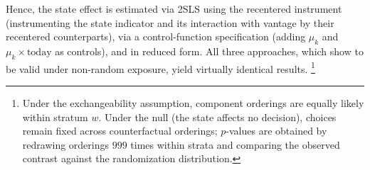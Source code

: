 \documentclass[11pt,a4paper]{article}
\theoremstyle{plain}
\theoremstyle{definition}
\begin{document}
Hence, the state effect is estimated via 2SLS using the recentered instrument (instrumenting the state indicator and its interaction with vantage by their recentered counterparts), via a control-function specification (adding $\mu_k$ and $\mu_k \times \text{today}$ as controls), and in reduced form. 
All three approaches, which \citet{borusyak2023} show to be valid under non-random exposure, yield virtually identical results.%
\footnote{%
Under the exchangeability assumption, component orderings are equally likely within stratum $w$. Under the null (the state affects no decision), %
choices remain fixed across counterfactual orderings; $p$-values are obtained by redrawing orderings $999$ times within strata and comparing the observed contrast against the %
randomization distribution.}
\end{document}
